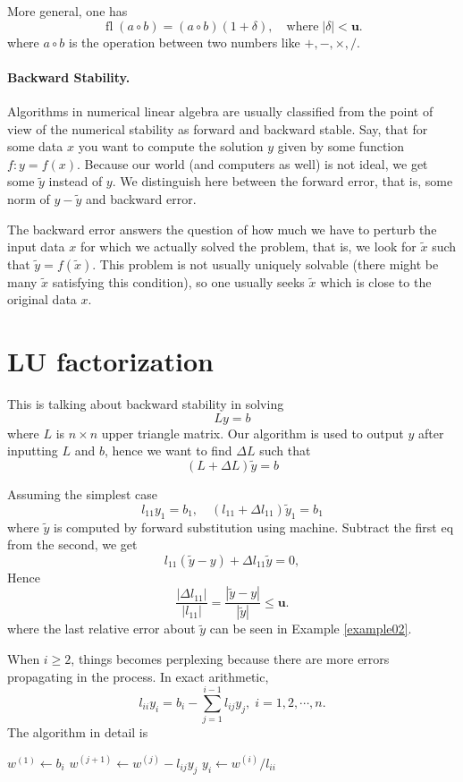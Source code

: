 \documentclass[dvipsnames, 12pt]{article}
\newcommand{\uu}{\mathbf{u}}
\begin{document}
More general, one has
$$
\operatorname{fl}(a\circ b)=(a\circ b)(1+\delta), \quad \text{where}\; |\delta|< \uu.
$$
where $a\circ b$ is the operation between two numbers like $+,-,\times,/$.


\paragraph{Backward Stability.}
Algorithms in numerical linear algebra are usually classified from the point of view of the numerical stability as forward and backward stable. Say, that for some data $x$ you want to compute the solution $y$ given by some function $f: y=f(x)$. Because our world (and computers as well) is not ideal, we get some $\tilde{y}$ instead of $y$. We distinguish here between the forward error, that is, some norm of $y-\tilde{y}$ and backward error. 

The backward error answers the question of how much we have to perturb the input data $x$ for which we actually solved the problem, that is, we look for $\tilde{x}$ such that $\tilde{y}=f(\tilde{x})$. This problem is not usually uniquely solvable (there might be many $\tilde{x}$ satisfying this condition), so one usually seeks $\tilde{x}$ which is close to the original data $x$.


\newpage
\section{LU factorization}

\begin{problem}{}
    This is talking about backward stability in solving
$$
Ly=b
$$
where $L$ is $n\times n$ upper triangle matrix. Our algorithm is used to output $y$ after inputting $L$ and $b$, hence we want to find $\Delta L$ such that
\begin{equation}\label{eq02}
    (L+\Delta L)\tilde{y}=b
\end{equation}
\end{problem}

 
Assuming the simplest case
$$
l_{11}y_1=b_1,\quad (l_{11}+\Delta l_{11})\tilde{y}_{1}=b_1
$$
where $\tilde{y}$ is computed by forward substitution using machine. Subtract the first eq from the second, we get
$$
l_{11}(\tilde{y}-y)+\Delta l_{11}\tilde{y}=0,
$$
Hence
$$
\frac{|\Delta l_{11}|}{|l_{11}|}=\frac{|\tilde{y}-y|}{|\tilde{y}|} \leq \uu.
$$
where the last relative error about $\tilde{y}$ can be seen in Example \ref{example02}.

When $i\geq 2$, things becomes perplexing because there are more errors propagating in the process. In exact arithmetic, 
$$
l_{ii} y_{i}=b_{i}-\sum_{j=1}^{i-1}l_{ij}y_{j},\; i=1,2,\cdots,n.
$$
The algorithm in detail is
\begin{algorithm}
    \begin{algorithmic}[1]
       \State $w^{(1)}\gets b_{i}$\;
           \State $w^{(j+1)}\gets w^{(j)}-l_{ij}y_{j}$ \;
        \EndFor
    \State $y_{i}\gets w^{(i)}/l_{ii}$\;
    \EndFor
    \end{algorithmic}
\end{algorithm}
\end{document}
